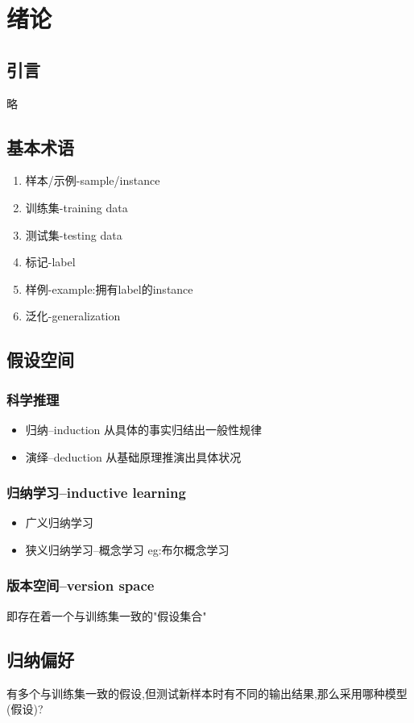 \section{绪论}
\subsection{引言}
略
\subsection{基本术语}
\begin{enumerate}[label=(\roman*)]
    \item 样本/示例-sample/instance
    \item 训练集-training data
    \item 测试集-testing data
    \item 标记-label 
    \item 样例-example:拥有label的instance
    \item 泛化-generalization
\end{enumerate}
\subsection{假设空间}
\subsubsection{科学推理}
\begin{itemize}
    \item 归纳--induction
    从具体的事实归结出一般性规律
    \item 演绎--deduction
    从基础原理推演出具体状况
\end{itemize}
\subsubsection{归纳学习--inductive learning}
\begin{itemize}
    \item 广义归纳学习
    \item 狭义归纳学习--概念学习
    eg:布尔概念学习
\end{itemize}
\subsubsection{版本空间--version space}
即存在着一个与训练集一致的"假设集合"
\subsection{归纳偏好}
有多个与训练集一致的假设,但测试新样本时有不同的输出结果,那么采用哪种模型(假设)?
